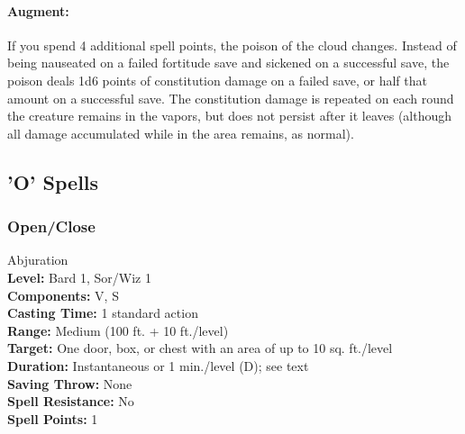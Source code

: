 \paragraph{Augment:} If you spend 4 additional spell points, the poison of the cloud changes. Instead of being nauseated on a failed
fortitude save and sickened on a successful save, the poison deals 1d6 points of constitution damage on a failed save,
or half that amount on a successful save. 
The constitution damage is repeated on each round the creature remains in the vapors, but does not persist after it leaves
(although all damage accumulated while in the area remains, as normal).
\subsection{'O' Spells}
\subsubsection{Open/Close}
\label{Spell:OpenClose}
Abjuration
\\ \textbf{Level:} Bard 1, Sor/Wiz 1
\\ \textbf{Components:} V, S
\\ \textbf{Casting Time:} 1 standard action
\\ \textbf{Range:} Medium (100 ft. + 10 ft./level)
\\ \textbf{Target:} One door, box, or chest with an area of up to 10 sq. ft./level
\\ \textbf{Duration:} Instantaneous or 1 min./level (D); see text
\\ \textbf{Saving Throw:} None
\\ \textbf{Spell Resistance:} No
\\ \textbf{Spell Points:} 1

